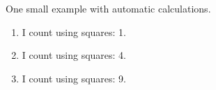 \documentclass[12pt]{article}
\begin{document}
One small example with automatic calculations.

\begin{enumerate}
    \item I count using squares: 1.
    \item I count using squares: 4.
    \item I count using squares: 9.
\end{enumerate}
\end{document}
